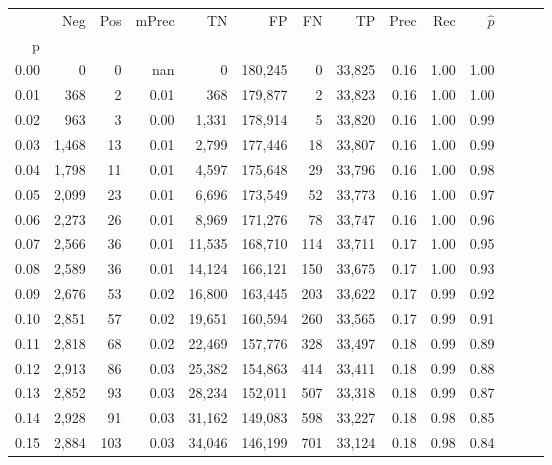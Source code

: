 \begin{tabular}{rrrrrrrrrrrrrr}
\toprule
{} &    Neg &  Pos & mPrec &       TN &       FP &      FN &      TP &  Prec &   Rec & $\hat{p}$ \\
p    &        &      &       &          &          &         &         &       &       &           \\
\midrule
0.00 &      0 &    0 &   nan &        0 &  180,245 &       0 &  33,825 &  0.16 &  1.00 &      1.00 \\
0.01 &    368 &    2 &  0.01 &      368 &  179,877 &       2 &  33,823 &  0.16 &  1.00 &      1.00 \\
0.02 &    963 &    3 &  0.00 &    1,331 &  178,914 &       5 &  33,820 &  0.16 &  1.00 &      0.99 \\
0.03 &  1,468 &   13 &  0.01 &    2,799 &  177,446 &      18 &  33,807 &  0.16 &  1.00 &      0.99 \\
0.04 &  1,798 &   11 &  0.01 &    4,597 &  175,648 &      29 &  33,796 &  0.16 &  1.00 &      0.98 \\
0.05 &  2,099 &   23 &  0.01 &    6,696 &  173,549 &      52 &  33,773 &  0.16 &  1.00 &      0.97 \\
0.06 &  2,273 &   26 &  0.01 &    8,969 &  171,276 &      78 &  33,747 &  0.16 &  1.00 &      0.96 \\
0.07 &  2,566 &   36 &  0.01 &   11,535 &  168,710 &     114 &  33,711 &  0.17 &  1.00 &      0.95 \\
0.08 &  2,589 &   36 &  0.01 &   14,124 &  166,121 &     150 &  33,675 &  0.17 &  1.00 &      0.93 \\
0.09 &  2,676 &   53 &  0.02 &   16,800 &  163,445 &     203 &  33,622 &  0.17 &  0.99 &      0.92 \\
0.10 &  2,851 &   57 &  0.02 &   19,651 &  160,594 &     260 &  33,565 &  0.17 &  0.99 &      0.91 \\
0.11 &  2,818 &   68 &  0.02 &   22,469 &  157,776 &     328 &  33,497 &  0.18 &  0.99 &      0.89 \\
0.12 &  2,913 &   86 &  0.03 &   25,382 &  154,863 &     414 &  33,411 &  0.18 &  0.99 &      0.88 \\
0.13 &  2,852 &   93 &  0.03 &   28,234 &  152,011 &     507 &  33,318 &  0.18 &  0.99 &      0.87 \\
0.14 &  2,928 &   91 &  0.03 &   31,162 &  149,083 &     598 &  33,227 &  0.18 &  0.98 &      0.85 \\
0.15 &  2,884 &  103 &  0.03 &   34,046 &  146,199 &     701 &  33,124 &  0.18 &  0.98 &      0.84 \\

\end{tabular}
